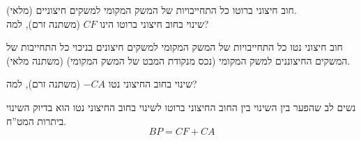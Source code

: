 \documentclass[10pt,usenames,dvipsnames]{beamer}
\begin{document}
\begin{RTL}
\begin{frame}[allowframebreaks]
    \framebreak

    \begin{block}{חוב חיצוני ברוטו}
        כל התחייבויות של המשק המקומי למשקים חיצוניים (מלאי).\\

        שינוי בחוב חיצוני ברוטו הינו $CF$ (משתנה זרם), למה?
        
    \end{block}

    \begin{block}{חוב חיצוני נטו}
        כל התחייבויות של המשק המקומי למשקים חיצונים בניכוי כל התחייבות של המשקים החיצוננים למשק המקומי (נכס מנקודת המבט של המשק המקומי) (משתנה מלאי).


        שינוי בחוב החיצוני נטו $-CA$ (משתנה זרם), למה?
    \end{block}

    נשים לב שהפער בין השינוי בין החוב החיצוני ברוטו לשינוי בחוב החיצוני נטו הוא בדיוק השינוי ביתרות המט''ח.
    $$
    BP = CF + CA
    $$
\end{frame}


\end{RTL}
\end{document}
